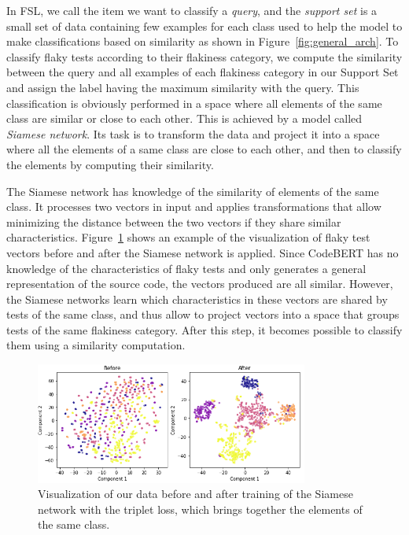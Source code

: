 In FSL, we call the item we want to classify a \textit{query}, and the \textit{support set} is a small set of data containing few examples for each class used to help the model to make classifications based on similarity as shown in Figure~\ref{fig:general_arch}.
To classify flaky tests according to their flakiness category, we compute the similarity between the query and all examples of each flakiness category in our Support Set and assign the label having the maximum similarity with the query. This classification is obviously performed in a space where all elements of the same class are similar or close to each other. This is achieved by a model called \textit{Siamese network}. Its task is to transform the data and project it into a space where all the elements of a same class are close to each other, and then to classify the elements by computing their similarity.



The Siamese network has knowledge of the similarity of elements of the same class. It processes two vectors in input and applies transformations that allow minimizing the distance between the two vectors if they share similar characteristics. Figure~\ref{fig:before_after} shows an example of the visualization of flaky test vectors before and after the Siamese network is applied. Since CodeBERT has no knowledge of the characteristics of flaky tests and only generates a general representation of the source code, the vectors produced are all similar.
However, the Siamese networks learn which characteristics in these vectors are shared by tests of the same class, and thus allow to project vectors into a space that groups tests of the same flakiness category. After this step, it becomes possible to classify them using a similarity computation.

\begin{figure}[htbp]
\centering
\includegraphics[width = 0.8\textwidth, scale=1]{figures/flakycat/before_after.PNG}
\caption{Visualization of our data before and after training of the Siamese network with the triplet loss, which brings together the elements of the same class.}
\label{fig:before_after}
\end{figure}
\vspace{3mm}

